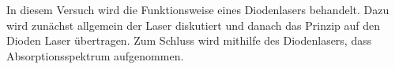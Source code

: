 In diesem Versuch wird die Funktionsweise eines Diodenlasers behandelt.
Dazu wird zunächst allgemein der Laser diskutiert und danach das Prinzip auf den Dioden Laser übertragen.
Zum Schluss wird mithilfe des Diodenlasers, dass Absorptionsspektrum aufgenommen.